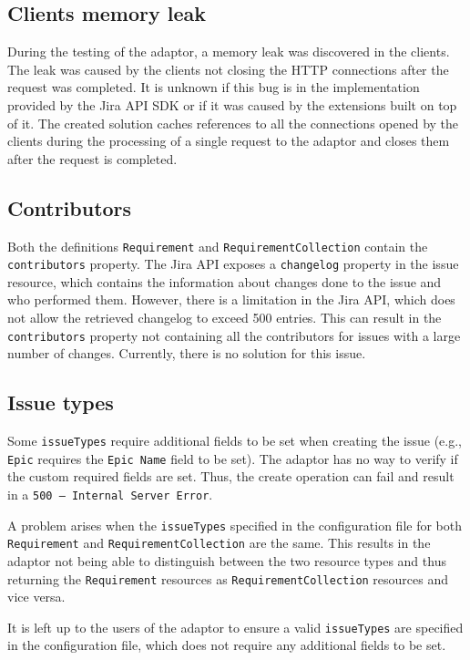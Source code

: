 \subsection*{Clients memory leak}
During the testing of the adaptor, a memory leak was discovered in the clients. The leak was caused by the clients not closing the HTTP connections after the request was completed. It is unknown if this bug is in the implementation provided by the Jira API SDK or if it was caused by the extensions built on top of it. The created solution caches references to all the connections opened by the clients during the processing of a single request to the adaptor and closes them after the request is completed.

\subsection*{Contributors}
Both the definitions \texttt{Requirement} and \texttt{RequirementCollection} contain the \texttt{contributors} property. The Jira API exposes a \texttt{changelog} property in the issue resource, which contains the information about changes done to the issue and who performed them. However, there is a limitation in the Jira API, which does not allow the retrieved changelog to exceed 500 entries. This can result in the \texttt{contributors} property not containing all the contributors for issues with a large number of changes. Currently, there is no solution for this issue.

\subsection*{Issue types}
Some \texttt{issueTypes} require additional fields to be set when creating the issue (e.g., \texttt{Epic} requires the \texttt{Epic Name} field to be set). The adaptor has no way to verify if the custom required fields are set. Thus, the create operation can fail and result in a \texttt{500 -- Internal Server Error}.

A problem arises when the \texttt{issueTypes} specified in the configuration file for both \texttt{Requirement} and \texttt{RequirementCollection} are the same. This results in the adaptor not being able to distinguish between the two resource types and thus returning the \texttt{Requirement} resources as \texttt{RequirementCollection} resources and vice versa.

It is left up to the users of the adaptor to ensure a valid \texttt{issueTypes} are specified in the configuration file, which does not require any additional fields to be set.

